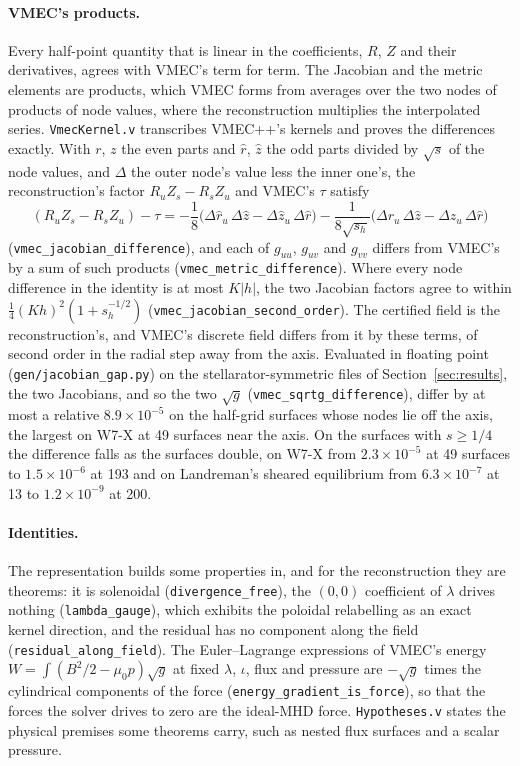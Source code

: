 \documentclass[11pt]{article}
\newcommand{\code}[1]{\texttt{#1}}
\newcommand{\sqg}{\sqrt{g}}
\begin{document}
\paragraph{VMEC's products.}
Every half-point quantity that is linear in the coefficients, $R$, $Z$ and their
derivatives, agrees with VMEC's term for term. The Jacobian and the metric
elements are products, which VMEC forms from averages over the two nodes of
products of node values, where the reconstruction multiplies the interpolated
series. \code{VmecKernel.v} transcribes VMEC++'s kernels and proves the
differences exactly. With $r$, $z$ the even parts and $\hat r$, $\hat z$ the odd
parts divided by $\sqrt{s}$ of the node values, and $\Delta$ the outer node's
value less the inner one's, the reconstruction's factor $R_uZ_s-R_sZ_u$ and
VMEC's $\tau$ satisfy
\begin{equation}
(R_uZ_s-R_sZ_u)-\tau=-{\textstyle\frac18}\bigl(\Delta\hat r_u\,\Delta\hat z-\Delta\hat z_u\,\Delta\hat r\bigr)
-\frac{1}{8\sqrt{s_h}}\bigl(\Delta r_u\,\Delta\hat z-\Delta z_u\,\Delta\hat r\bigr)
\end{equation}
(\code{vmec\_jacobian\_difference}), and each of $g_{uu}$, $g_{uv}$ and $g_{vv}$
differs from VMEC's by a sum of such products (\code{vmec\_metric\_difference}).
Where every node difference in the identity is at most $K|h|$, the two
Jacobian factors agree to within ${\textstyle\frac14}(Kh)^2(1+s_h^{-1/2})$
(\code{vmec\_jacobian\_second\_order}). The certified field is the
reconstruction's, and VMEC's discrete field differs from it by these terms,
of second order in the radial step away from the axis. Evaluated in floating point
(\code{gen/jacobian\_gap.py}) on the stellarator-symmetric files of
Section~\ref{sec:results}, the two Jacobians, and so the two $\sqg$
(\code{vmec\_sqrtg\_difference}), differ by at most a relative
$8.9\times10^{-5}$ on the half-grid surfaces whose nodes lie off the axis, the
largest on W7-X at 49 surfaces near the axis. On the surfaces with $s\ge1/4$
the difference falls as the surfaces double, on W7-X from $2.3\times10^{-5}$ at
49 surfaces to $1.5\times10^{-6}$ at 193 and on Landreman's sheared equilibrium
from $6.3\times10^{-7}$ at 13 to $1.2\times10^{-9}$ at 200.

\paragraph{Identities.}
The representation builds some properties in, and for the reconstruction they
are theorems: it is solenoidal
(\code{divergence\_free}), the $(0,0)$ coefficient of $\lambda$ drives nothing
(\code{lambda\_gauge}), which exhibits the poloidal relabelling as an exact
kernel direction, and the residual has no component along the field
(\code{residual\_along\_field}). The
Euler--Lagrange expressions of VMEC's energy $W=\int(B^2/2-\mu_0p)\sqg$ at fixed
$\lambda$, $\iota$, flux and pressure are $-\sqg$ times the cylindrical
components of the force (\code{energy\_gradient\_is\_force}), so that the
forces the solver drives to zero are the ideal-MHD force. \code{Hypotheses.v}
states the physical premises some theorems carry, such as nested flux surfaces
and a scalar pressure.
\end{document}
